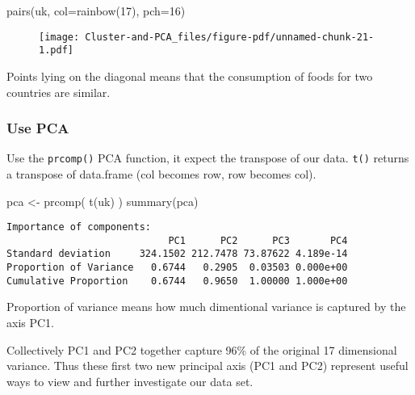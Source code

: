 \documentclass[
  letterpaper,
  DIV=11,
  numbers=noendperiod]{scrartcl}
\newenvironment{Shaded}{\begin{snugshade}}{\end{snugshade}}
\newcommand{\AttributeTok}[1]{\textcolor[rgb]{0.40,0.45,0.13}{#1}}
\newcommand{\DecValTok}[1]{\textcolor[rgb]{0.68,0.00,0.00}{#1}}
\newcommand{\FunctionTok}[1]{\textcolor[rgb]{0.28,0.35,0.67}{#1}}
\newcommand{\NormalTok}[1]{\textcolor[rgb]{0.00,0.23,0.31}{#1}}
\newcommand{\OtherTok}[1]{\textcolor[rgb]{0.00,0.23,0.31}{#1}}
\begin{document}
\begin{Shaded}
\begin{Highlighting}[]
\FunctionTok{pairs}\NormalTok{(uk, }\AttributeTok{col=}\FunctionTok{rainbow}\NormalTok{(}\DecValTok{17}\NormalTok{), }\AttributeTok{pch=}\DecValTok{16}\NormalTok{)}
\end{Highlighting}
\end{Shaded}

\begin{figure}[H]

{\centering \texttt{[image: Cluster-and-PCA\_files/figure-pdf/unnamed-chunk-21-1.pdf]}

}

\end{figure}

Points lying on the diagonal means that the consumption of foods for two
countries are similar.

\hypertarget{use-pca}{%
\subsubsection{Use PCA}\label{use-pca}}

Use the \texttt{prcomp()} PCA function, it expect the transpose of our
data. \texttt{t()} returns a transpose of data.frame (col becomes row,
row becomes col).

\begin{Shaded}
\begin{Highlighting}[]
\NormalTok{pca }\OtherTok{\textless{}{-}} \FunctionTok{prcomp}\NormalTok{( }\FunctionTok{t}\NormalTok{(uk) )}
\FunctionTok{summary}\NormalTok{(pca)}
\end{Highlighting}
\end{Shaded}

\begin{verbatim}
Importance of components:
                            PC1      PC2      PC3       PC4
Standard deviation     324.1502 212.7478 73.87622 4.189e-14
Proportion of Variance   0.6744   0.2905  0.03503 0.000e+00
Cumulative Proportion    0.6744   0.9650  1.00000 1.000e+00
\end{verbatim}

Proportion of variance means how much dimentional variance is captured
by the axis PC1.

Collectively PC1 and PC2 together capture 96\% of the original 17
dimensional variance. Thus these first two new principal axis (PC1 and
PC2) represent useful ways to view and further investigate our data set.
\end{document}
